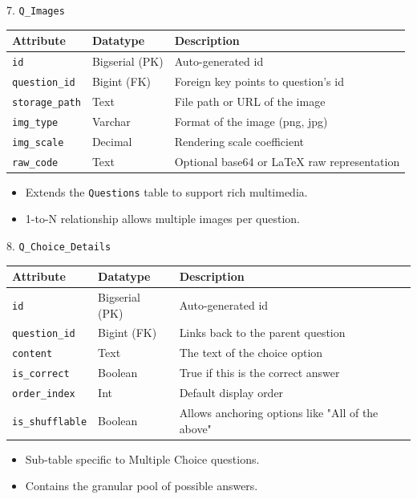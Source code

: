 \documentclass[aspectratio=169, 10pt]{beamer}
\begin{document}
\begin{frame}{7. \texttt{Q\_Images}}
    \centering
    \small
    \begin{tabular}{|l|l|p{8cm}|}
        \hline
        \textbf{Attribute} & \textbf{Datatype} & \textbf{Description} \\ \hline
        \texttt{id} & Bigserial (PK) & Auto-generated id\\ \hline
        \texttt{question\_id} & Bigint (FK) & Foreign key points to question's id\\ \hline
        \texttt{storage\_path} & Text & File path or URL of the image\\ \hline
        \texttt{img\_type} & Varchar & Format of the image (png, jpg)\\ \hline
        \texttt{img\_scale} & Decimal & Rendering scale coefficient\\ \hline
        \texttt{raw\_code} & Text & Optional base64 or LaTeX raw representation\\ \hline
    \end{tabular}
    \vspace{0.3cm}
    \begin{itemize}
        \item Extends the \texttt{Questions} table to support rich multimedia.
        \item 1-to-N relationship allows multiple images per question.
    \end{itemize}
\end{frame}


\begin{frame}{8. \texttt{Q\_Choice\_Details}}
    \centering
    \small
    \begin{tabular}{|l|l|p{8cm}|}
        \hline
        \textbf{Attribute} & \textbf{Datatype} & \textbf{Description} \\ \hline
        \texttt{id} & Bigserial (PK) & Auto-generated id\\ \hline
        \texttt{question\_id} & Bigint (FK) & Links back to the parent question\\ \hline
        \texttt{content} & Text & The text of the choice option\\ \hline
        \texttt{is\_correct} & Boolean & True if this is the correct answer\\\hline 
        \texttt{order\_index} & Int & Default display order\\ \hline
        \texttt{is\_shufflable} & Boolean & Allows anchoring options like "All of the above"\\ \hline
    \end{tabular}
    \vspace{0.3cm}
    \begin{itemize}
        \item Sub-table specific to Multiple Choice questions.
        \item Contains the granular pool of possible answers.
    \end{itemize}
\end{frame}
\end{document}
